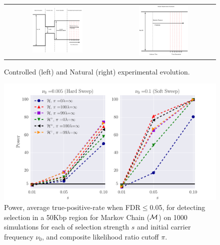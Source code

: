 \documentclass[11pt]{article}
\begin{document}
\begin{figure}[H]
	\centering
	\begin{tabular}{cc}
	\includegraphics[trim=0.1in 0 .08in 0.02in , clip,width=0.5\textwidth]{figures/ControlledExperimentalEvolution.pdf}
&	\includegraphics[trim=0.1in 0 .08in 0.02in , clip,width=0.5\textwidth]{figures/NaturalExperimentalEvolution.pdf}
	\end{tabular}
	\caption{Controlled (left) and Natural (right) experimental evolution. } \label{fig:ee}
\end{figure}

\begin{figure}[H]
	\centering
	\includegraphics[trim=0.4in 0 .8in 0.02in , clip,width=\textwidth]{figures/powerCLR.pdf}
	\caption{Power, average true-positive-rate when FDR$\le$0.05, for detecting selection in a 50Kbp region for Markov Chain (${\cal M}$) on 1000 
		simulations for each of selection strength $s$ and initial 
		carrier frequency $\nu_0$, and composite likelihood ratio cutoff $\pi$.  } \label{fig:powerCLR}
\end{figure}
\end{document}

